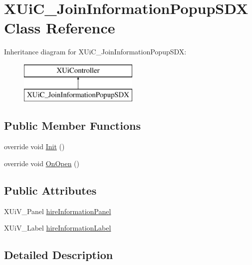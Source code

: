 \hypertarget{class_x_ui_c___join_information_popup_s_d_x}{}\section{X\+Ui\+C\+\_\+\+Join\+Information\+Popup\+S\+DX Class Reference}
\label{class_x_ui_c___join_information_popup_s_d_x}
Inheritance diagram for X\+Ui\+C\+\_\+\+Join\+Information\+Popup\+S\+DX\+:\begin{figure}[H]
\begin{center}
\leavevmode
\includegraphics[height=2.000000cm]{da/d90/class_x_ui_c___join_information_popup_s_d_x}
\end{center}
\end{figure}
\subsection*{Public Member Functions}
\begin{DoxyCompactItemize}
\item 
override void \mbox{\hyperlink{class_x_ui_c___join_information_popup_s_d_x_a082249d975c4620867a377e6eaa0592a}{Init}} ()
\item 
override void \mbox{\hyperlink{class_x_ui_c___join_information_popup_s_d_x_ad1dbd19ce49236723af97ed4779f5bb8}{On\+Open}} ()
\end{DoxyCompactItemize}
\subsection*{Public Attributes}
\begin{DoxyCompactItemize}
\item 
X\+Ui\+V\+\_\+\+Panel \mbox{\hyperlink{class_x_ui_c___join_information_popup_s_d_x_a6a70d0fb5365be369bd36c8c84002861}{hire\+Information\+Panel}}
\item 
X\+Ui\+V\+\_\+\+Label \mbox{\hyperlink{class_x_ui_c___join_information_popup_s_d_x_ad53b9e62d87c0f846e168f6e161077b3}{hire\+Information\+Label}}
\end{DoxyCompactItemize}


\subsection{Detailed Description}


